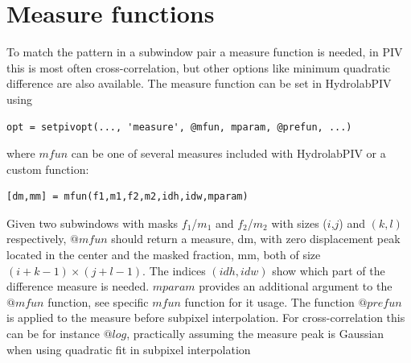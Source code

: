 \documentclass[10pt]{article}
\begin{document}
\section{Measure functions}
 To match the pattern in a subwindow pair a measure function is needed, in PIV this is
 most often cross-correlation, but other options like minimum quadratic difference are also available.
 The measure function can be set in HydrolabPIV using
\begin{lstlisting}
opt = setpivopt(..., 'measure', @mfun, mparam, @prefun, ...)  
\end{lstlisting}
  where $mfun$ can be one of several measures included with HydrolabPIV or a custom function:
\begin{lstlisting}
[dm,mm] = mfun(f1,m1,f2,m2,idh,idw,mparam)   
\end{lstlisting}   
  Given two subwindows with masks $f_1$/$m_1$ and $f_2$/$m_2$ with sizes ($i$,$j$) and $(k,l)$
  respectively, $@mfun$ should return a measure, dm, with zero 
  displacement peak located in the center and  the masked fraction, mm,
  both of size $(i+k-1)\times(j+l-1)$. The indices $(idh,idw)$ show which part of 
  the difference measure is needed. 
  $mparam$ provides an additional argument to the $@mfun$ function, see
  specific $mfun$ function for it usage. 
  The function $@prefun$ is applied to the measure before subpixel interpolation. 
  For cross-correlation this can be for instance $@log$, practically assuming the measure peak is   
  Gaussian when using quadratic fit in subpixel interpolation  
\end{document}
